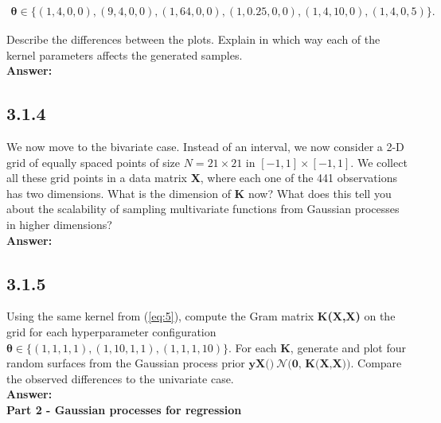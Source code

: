 \documentclass[a4paper]{article}
\begin{document}
\begin{align*}
\boldsymbol{\theta} \in \{(1,4,0,0),(9,4,0,0),(1,64,0,0),(1,0.25,0,0),(1,4,10,0),(1,4,0,5)\}.
\end{align*}

Describe the differences between the plots. Explain in which way each of the kernel parameters affects the generated samples.\\


\textbf{Answer:}\\





\subsection*{3.1.4}

We now move to the bivariate case. Instead of an interval, we now consider a 2-D grid of equally spaced points of size $N = 21 \times 21$ in $[-1,1] \times [-1,1]$. We collect all these grid points in a data matrix \textbf{X}, where each one of the 441 observations has two dimensions. What is the dimension of \textbf{K} now? What does this tell you about the scalability of sampling multivariate functions from Gaussian processes in higher dimensions?\\

\textbf{Answer:}\\






\subsection*{3.1.5}

Using the same kernel from (\ref{eq:5}), compute the Gram matrix \textbf{K(X,X)} on the grid for each hyperparameter configuration $\boldsymbol{\theta} \in \{(1, 1, 1, 1), (1, 10, 1, 1), (1, 1, 1, 10)\}$. For each \textbf{K}, generate and plot four random surfaces from the Gaussian process prior $\textbf{yX()} ~\mathcal{N}\textbf{(0, K(X,X)})$. Compare the observed differences to the univariate case.\\


\textbf{Answer:}\\








\textbf{Part 2 - Gaussian processes for regression}\\
\end{document}
